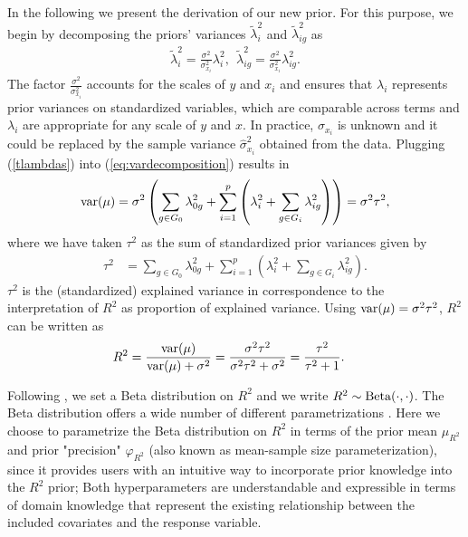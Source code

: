 In the following we present the derivation of our new prior. For this purpose, we begin by decomposing the priors' variances $\tilde{\lambda}^2_i$ and $\tilde{\lambda}_{ig}^2$ as
 \begin{align}
 \label{tlambdas}
 \tilde{\lambda}_i^2= \frac{\sigma^2}{  \sigma_{x_i}^2 } \lambda_i^2 , \ \
  \tilde{\lambda}_{ig}^2  =  \frac{\sigma^2}{  \sigma_{x_i}^2 } \lambda_{ig}^2.
 \end{align}
The factor $\frac{\sigma^2}{ \sigma_{x_i}^2}$ accounts for the scales of $y$ and $x_i$ and ensures that $\lambda_i$ represents prior variances on standardized variables, which are comparable across terms and $\lambda_i$ are appropriate for any scale of $y$ and $x$. In practice, $\sigma_{x_i}$ is unknown and it could be  replaced by the sample variance $ \hat{\sigma}_{x_i}^2 $ obtained from the data. Plugging (\ref{tlambdas}) into (\ref{eq:vardecomposition}) results in
\[  \text{var}(\mu)= \sigma^2  \left( \sum_{g\in G_0} \lambda_{0g}^2   + \sum_{i=1}^p  \left(   \lambda^2_i+  \sum_{g\in G_i} \lambda_{ig}^2  \right) \right) = \sigma^2 \tau^2,    \]
where we have taken $\tau^2$ as the sum of standardized prior variances given  by
\begin{align}
\label{totvariance}
\tau^2 &= \sum_{g\in G_0} \lambda_{0g}^2   + \sum_{i=1}^p  \left(   \lambda^2_i+  \sum_{g\in G_i} \lambda_{ig}^2  \right) .
\end{align}
$\tau^2$ is the (standardized) explained variance in correspondence to the interpretation of $R^2$ as proportion of explained variance. Using $\text{var}(\mu)=\sigma^2 \tau^2$, $R^2$ can be written as
\begin{align}
\label{eq:r2ft2}
	R^2&= \frac{\text{var}(\mu)}{\text{var}(\mu)+\sigma^2 }=   \frac{  \sigma^2 \tau^2  }{  \sigma^2 \tau^2 + \sigma^2} = \frac{ \tau^2 }{\tau^2+1}.
\end{align}

Following \cite{r2d2zhang}, we set a Beta distribution on $R^2$ and we write $R^2\sim \text{Beta} (\cdot, \cdot )$. The Beta distribution offers a wide number of different parametrizations \citep{meanprecbeta}. Here we choose to parametrize the Beta distribution on $R^2$ in terms of the prior mean $\mu_{R^2}$ and prior "precision" $\varphi_{R^2}$ (also known as mean-sample size parameterization), since it provides users with an intuitive way to incorporate prior knowledge into the $R^2$ prior; Both hyperparameters are understandable and expressible in terms of domain knowledge that represent the existing relationship between the included covariates and the response variable.

